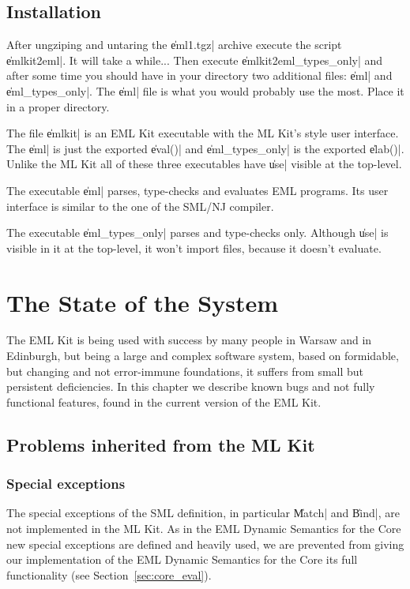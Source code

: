 \subsection{Installation}
\label{sec:installation}

After ungziping and untaring the \|eml1.tgz| archive
execute the script \|emlkit2eml|.
It will take a while... 
Then execute \|emlkit2eml_types_only|
and after some time you should have in your directory
two additional files: \|eml| and \|eml_types_only|.
The \|eml| file is what you would probably use the most.
Place it in a proper directory.

The file \|emlkit| is an EML Kit executable with the ML Kit's style user interface.
The \|eml| is just the exported \|eval()| and \|eml_types_only| 
is the exported \|elab()|. Unlike the ML Kit all of these three 
executables have \|use| visible at the top-level.

The executable \|eml| parses, type-checks and evaluates EML programs.  
Its user interface is similar to the one of the SML/NJ compiler.

The executable \|eml_types_only| parses and type-checks only.
Although \|use| is visible in it at the top-level, 
it won't import files, because it doesn't evaluate.

\section{The State of the System}
\label{sec:state}

The EML Kit is being used with success by many people
in Warsaw and in Edinburgh, but being a large and complex
software system, based on formidable, but changing and not error-immune foundations, 
it suffers from small but persistent deficiencies.
In this chapter we describe known bugs and not fully functional
features, found in the current version of the EML Kit. 

\subsection{Problems inherited from the ML Kit}

\subsubsection{Special exceptions}
\label{sec:special}

The special exceptions of the SML definition,
in particular \|Match| and \|Bind|, are not implemented in the ML Kit.
As in the EML Dynamic Semantics for the Core new special exceptions
are defined and heavily used, we are prevented from giving
our implementation of the EML Dynamic Semantics for the Core 
its full functionality (see Section~\ref{sec:core_eval}).

